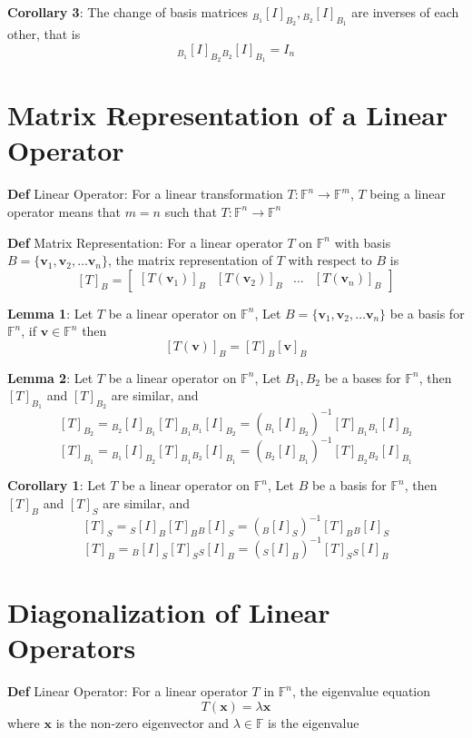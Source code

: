 \documentclass[11pt,notitlepage]{report}
\newcommand{\bb}[1]{\ensuremath{\mathbb{#1}}}
\newcommand{\tbf}[1]{\textbf{#1}}
\begin{document}
\textbf{Corollary 3}: The change of basis matrices ${}_{B_1}[I]_{B_2}, {}_{B_2}[I]_{B_1}$ are inverses of each other, that is
$${}_{B_1}[I]_{B_2}{}_{B_2}[I]_{B_1} = I_n$$

\newpage


\section{Matrix Representation of a Linear Operator}

\textbf{Def} Linear Operator: For a linear transformation $T: \bb F^n \to \bb F^m$, $T$ being a linear operator means that $m = n$ such that $T: \bb F^n \to \bb F^n$

\textbf{Def} Matrix Representation: For a linear operator $T$ on $\bb F^n$ with basis $B = \{\tbf v_1, \tbf v_2, \dots \tbf v_n\}$, the matrix representation of $T$ with respect to $B$ is
$$[T]_B = \begin{bmatrix}
[T(\tbf v_1)]_B & [T(\tbf v_2)]_B & \dots & [T(\tbf v_n)]_B
\end{bmatrix}$$

\textbf{Lemma 1}: Let $T$ be a linear operator on $\bb F^n$, Let $B = \{\tbf v_1, \tbf v_2, \dots \tbf v_n\}$ be a basis for $\bb F^n$, if $\tbf v \in \mathbb F^n$ then
$$[T(\tbf v)]_B = [T]_B[\tbf v]_B$$

\textbf{Lemma 2}: Let $T$ be a linear operator on $\bb F^n$, Let $B_1, B_2$ be a bases for $\bb F^n$, then $[T]_{B_1}$ and $[T]_{B_2}$ are similar, and
$$[T]_{B_2} = {}_{B_2}[I]_{B_1} [T]_{B_1} {}_{B_1}[I]_{B_2} = ({}_{B_1}[I]_{B_2})^{-1} [T]_{B_1} {}_{B_1}[I]_{B_2}$$
$$[T]_{B_1} = {}_{B_1}[I]_{B_2} [T]_{B_1} {}_{B_2}[I]_{B_1} = ({}_{B_2}[I]_{B_1})^{-1} [T]_{B_2} {}_{B_2}[I]_{B_1}$$

\textbf{Corollary 1}: Let $T$ be a linear operator on $\bb F^n$, Let $B$ be a basis for $\bb F^n$, then $[T]_{B}$ and $[T]_{S}$ are similar, and
$$[T]_{S} = {}_{S}[I]_{B} [T]_{B} {}_{B}[I]_{S} = ({}_{B}[I]_{S})^{-1} [T]_{B} {}_{B}[I]_{S}$$
$$[T]_{B} = {}_{B}[I]_{S} [T]_{S} {}_{S}[I]_{B} = ({}_{S}[I]_{B})^{-1} [T]_{S} {}_{S}[I]_{B}$$

\newpage

\section{Diagonalization of Linear Operators}

\textbf{Def} Linear Operator: For a linear operator $T$ in $\bb F^n$, the eigenvalue equation 
$$T(\tbf x) = \lambda \tbf x$$
where $\tbf x$ is the non-zero eigenvector and $\lambda \in \bb F$ is the eigenvalue
\end{document}
